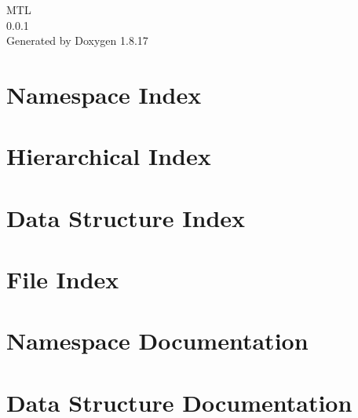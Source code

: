 \let\mypdfximage\pdfximage\def\pdfximage{\immediate\mypdfximage}\documentclass[twoside]{book}
\newcommand{\+}{\discretionary{\mbox{\scriptsize$\hookleftarrow$}}{}{}}
\newcommand{\clearemptydoublepage}{%
  \newpage{\pagestyle{empty}\cleardoublepage}%
}
\begin{document}
\hypersetup{pageanchor=false,
             bookmarksnumbered=true,
             pdfencoding=unicode
            }
\begin{titlepage}
\vspace*{7cm}
\begin{center}%
{\Large M\+TL \\[1ex]\large 0.\+0.\+1 }\\
\vspace*{1cm}
{\large Generated by Doxygen 1.8.17}\\
\end{center}
\end{titlepage}
\clearemptydoublepage
{}
\tableofcontents
\clearemptydoublepage
{}
\hypersetup{pageanchor=true}

\chapter{Namespace Index}

\chapter{Hierarchical Index}

\chapter{Data Structure Index}

\chapter{File Index}

\chapter{Namespace Documentation}

\chapter{Data Structure Documentation}


























\end{document}
